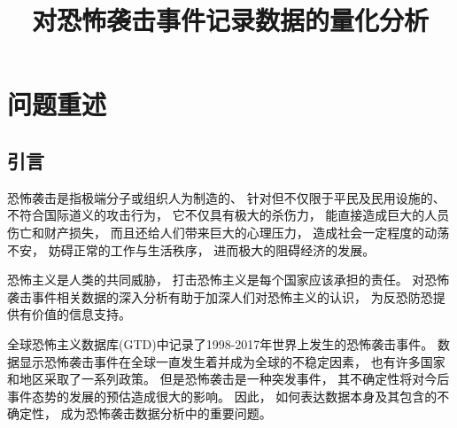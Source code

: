 \documentclass[bwprint]{gmcmthesis}
\title{对恐怖袭击事件记录数据的量化分析}
\begin{document}
 \maketitle

\begin{abstract}



%
%
%




\end{abstract}

\pagestyle{plain}

\tableofcontents


\newpage
\section{问题重述}

\subsection{引言}

恐怖袭击是指极端分子或组织人为制造的、
针对但不仅限于平民及民用设施的、
不符合国际道义的攻击行为，
它不仅具有极大的杀伤力，
能直接造成巨大的人员伤亡和财产损失，
而且还给人们带来巨大的心理压力，
造成社会一定程度的动荡不安，
妨碍正常的工作与生活秩序，
进而极大的阻碍经济的发展。

恐怖主义是人类的共同威胁，
打击恐怖主义是每个国家应该承担的责任。
对恐怖袭击事件相关数据的深入分析有助于加深人们对恐怖主义的认识，
为反恐防恐提供有价值的信息支持。

全球恐怖主义数据库(GTD)中记录了1998-2017年世界上发生的恐怖袭击事件。
数据显示恐怖袭击事件在全球一直发生着并成为全球的不稳定因素，
也有许多国家和地区采取了一系列政策。
但是恐怖袭击是一种突发事件，
其不确定性将对今后事件态势的发展的预估造成很大的影响。
因此，
如何表达数据本身及其包含的不确定性，
成为恐怖袭击数据分析中的重要问题。
\end{document}
